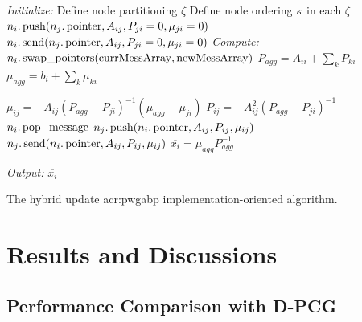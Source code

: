 \begin{algorithm}[!t]
	\centering
	\begin{algorithmic}[1]
		\small
		\STATE \textit{Initialize:}
		\STATE Define node partitioning $\zeta $
		\STATE Define node ordering $\kappa$ in each $\zeta$
		\STATE $n_i. \operatorname{push} (n_j. \operatorname{pointer} ,A_{ij}, P_{ji} = 0, \mu_{ji} = 0) $
		\AlgENDIF
		\STATE $n_i. \operatorname{send} (n_j. \operatorname{pointer} ,A_{ij}, P_{ji} = 0, \mu_{ji} = 0)  $
		\AlgENDIF
		\AlgENDFOR
		\STATE \textit{Compute: }
		\REPEAT[iterations]
		\STATE $n_i. \operatorname{swap\_pointers} ( \operatorname{currMessArray} , \operatorname{newMessArray} )$
		\AlgENDFOR
		\STATE $ P_{agg} = A_{ii} + \sum_k P_{ki}$
		\STATE $ \mu_{agg} = b_{i} + \sum_k \mu_{ki}$

		\STATE $\mu_{ij} = -A_{ij} (P_{agg} - P_{ji})^{-1} (\mu_{agg} - \mu_{ji}) $
		\STATE $P_{ij} = -A_{ij}^2 (P_{agg} - P_{ji})^{-1} $
		\STATE $n_i. \operatorname{pop\_message} $
		\STATE $n_j. \operatorname{push} (n_i. \operatorname{pointer} ,A_{ij}, P_{ij}, \mu_{ij})$
		\ELSE
		\STATE $n_j. \operatorname{send} (n_i. \operatorname{pointer} ,A_{ij}, P_{ij}, \mu_{ij})$
		\AlgENDIF
		\AlgENDFOR
		\STATE $\overline{x_i} = \mu_{agg} P_{agg}^{-1}$
		\AlgENDFOR

		\AlgENDFOR
		\STATE \textit{Output:} $\overline{x_{i}}$
	\end{algorithmic}
	\caption{The hybrid update \gls{acr:pwgabp} implementation-oriented algorithm.}
	\label{alg:hyb_gabp}
\end{algorithm}


\section{Results and Discussions}
\label{sec:pwgabpRes}



\subsection{Performance Comparison with D-PCG}


